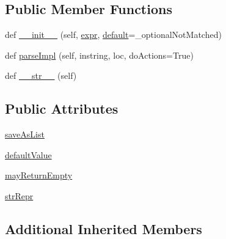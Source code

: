 \subsection*{Public Member Functions}
\begin{DoxyCompactItemize}
\item 
def \hyperlink{classsetuptools_1_1__vendor_1_1pyparsing_1_1Optional_a03acdb87a4205db8e25a4ded39b732ce}{\+\_\+\+\_\+init\+\_\+\+\_\+} (self, \hyperlink{classsetuptools_1_1__vendor_1_1pyparsing_1_1ParseElementEnhance_a445450bd765a74cc1d1567e40cade40d}{expr}, \hyperlink{namespacesetuptools_1_1__vendor_1_1pyparsing_a6c3b6a725f4106858579649949ebb702}{default}=\+\_\+optional\+Not\+Matched)
\item 
def \hyperlink{classsetuptools_1_1__vendor_1_1pyparsing_1_1Optional_a836f8c10ed1ac54f47ed8a99ed364114}{parse\+Impl} (self, instring, loc, do\+Actions=True)
\item 
def \hyperlink{classsetuptools_1_1__vendor_1_1pyparsing_1_1Optional_aa773455e67fdf106d587585d384c1b4b}{\+\_\+\+\_\+str\+\_\+\+\_\+} (self)
\end{DoxyCompactItemize}
\subsection*{Public Attributes}
\begin{DoxyCompactItemize}
\item 
\hyperlink{classsetuptools_1_1__vendor_1_1pyparsing_1_1Optional_a2f7baad9ccdd255c84df1695c609f4dd}{save\+As\+List}
\item 
\hyperlink{classsetuptools_1_1__vendor_1_1pyparsing_1_1Optional_a1337c761fd9525eca71a94dfaec01114}{default\+Value}
\item 
\hyperlink{classsetuptools_1_1__vendor_1_1pyparsing_1_1Optional_a595698691fa87a858c9e0b7a52f65a9c}{may\+Return\+Empty}
\item 
\hyperlink{classsetuptools_1_1__vendor_1_1pyparsing_1_1Optional_a4ece373bbdc974de87c5bf0bbcc8c811}{str\+Repr}
\end{DoxyCompactItemize}
\subsection*{Additional Inherited Members}


